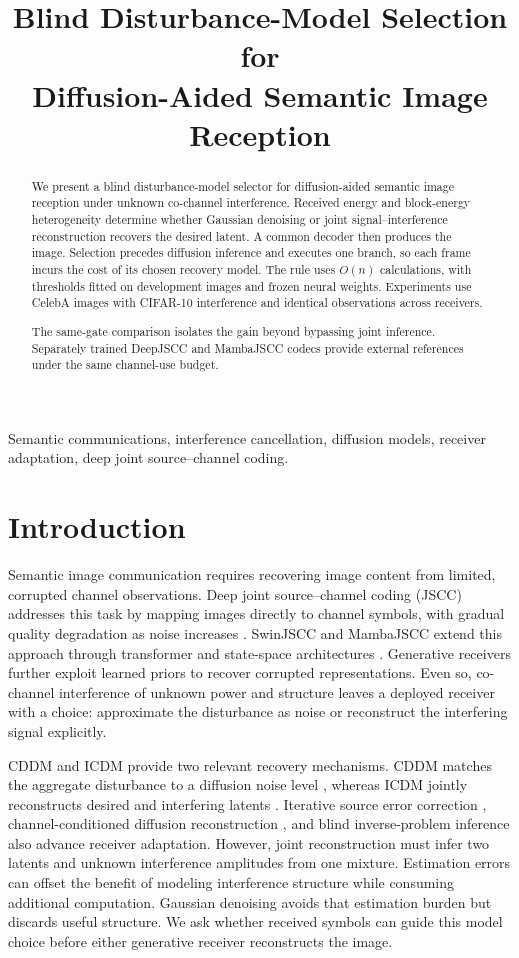 \documentclass[conference]{IEEEtran}
\title{Blind Disturbance-Model Selection for\\Diffusion-Aided Semantic Image Reception}
\author{\IEEEauthorblockN{Author information pending}
\IEEEauthorblockA{Affiliations and correspondence to be supplied}}
\begin{document}
\maketitle
\begin{abstract}
We present a blind disturbance-model selector for diffusion-aided semantic
image reception under unknown co-channel interference. Received energy and
block-energy heterogeneity determine whether Gaussian denoising or joint
signal--interference reconstruction recovers the desired latent. A common
decoder then produces the image. Selection precedes diffusion inference and
executes one branch, so each frame incurs the cost of its chosen recovery
model. The rule uses $O(n)$ calculations, with thresholds fitted on development
images and frozen neural weights. Experiments use CelebA images with CIFAR-10
interference and identical observations across receivers.

The same-gate comparison isolates the gain beyond bypassing joint inference.
Separately trained DeepJSCC and MambaJSCC codecs provide external references
under the same channel-use budget.
\end{abstract}
\begin{IEEEkeywords}
Semantic communications, interference cancellation, diffusion models,
receiver adaptation, deep joint source--channel coding.
\end{IEEEkeywords}
\DraftNotice

\section{Introduction}
Semantic image communication requires recovering image content from limited,
corrupted channel observations. Deep joint source--channel coding (JSCC)
addresses this task by mapping images directly to channel symbols, with
gradual quality degradation as noise increases \cite{bourtsoulatze2019deep}.
SwinJSCC and MambaJSCC extend this approach through transformer and state-space
architectures \cite{yang2025swinjscc,wu2024mambajscc}. Generative receivers
further exploit learned priors to recover corrupted representations. Even so,
co-channel interference of unknown power and structure leaves a deployed
receiver with a choice: approximate the disturbance as noise or reconstruct
the interfering signal explicitly.

CDDM and ICDM provide two relevant recovery mechanisms. CDDM matches the
aggregate disturbance to a diffusion noise level \cite{wu2024cddm}, whereas
ICDM jointly reconstructs desired and interfering latents \cite{wu2026icdm}.
Iterative source error correction \cite{pmlr-v206-lee23c}, channel-conditioned
diffusion reconstruction \cite{wang2025diffcom}, and blind inverse-problem
inference \cite{murata2023gibbsddrm} also advance receiver adaptation. However,
joint reconstruction must infer two latents and unknown interference
amplitudes from one mixture. Estimation errors can offset the benefit of
modeling interference structure while consuming additional computation.
Gaussian denoising avoids that estimation burden but discards useful
structure. We ask whether received symbols can guide this model choice before
either generative receiver reconstructs the image.
\end{document}
